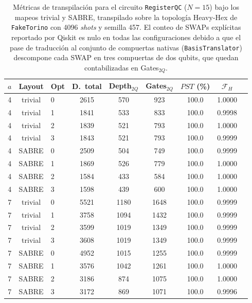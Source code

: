 \documentclass[12pt, spanish]{book}
\begin{document}
\begin{table}[H]
    \centering
    \caption{Métricas de transpilación para el circuito \texttt{RegisterQC} ($N = 15$) bajo los
    mapeos trivial y SABRE, transpilado sobre la topología Heavy-Hex de \texttt{FakeTorino} con
    4096 \textit{shots} y semilla 457. El conteo de SWAPs explícitas reportado por Qiskit es nulo en
    todas las configuraciones debido a que el pase de traducción al conjunto de compuertas
    nativas (\texttt{BasisTranslator}) descompone cada SWAP en tres compuertas de dos qubits,
    que quedan contabilizadas en Gates$_{2Q}$.}
    \label{tab:transpilacion_faketorino_sabre}
    \small
    \begin{tabular}{cclcccccc}
        \hline
        $a$ & Layout  & Opt & D.\ total & Depth$_{2Q}$ & Gates$_{2Q}$ & $PST$ (\%) & $\mathcal{F}_H$ \\
        \hline
        4  & trivial & 0 & 2615 & 570  & 923  & 100.0 & 1.0000 \\
        4  & trivial & 1 & 1841 & 533  & 833  & 100.0 & 0.9998 \\
        4  & trivial & 2 & 1839 & 521  & 793  & 100.0 & 1.0000 \\
        4  & trivial & 3 & 1843 & 521  & 793  & 100.0 & 0.9999 \\
        4  & SABRE   & 0 & 2509 & 504  & 749  & 100.0 & 0.9999 \\
        4  & SABRE   & 1 & 1869 & 526  & 779  & 100.0 & 1.0000 \\
        4  & SABRE   & 2 & 1584 & 433  & 584  & 100.0 & 1.0000 \\
        4  & SABRE   & 3 & 1598 & 439  & 600  & 100.0 & 1.0000 \\
        \hline
        7  & trivial & 0 & 5521 & 1180 & 1648 & 100.0 & 0.9999 \\
        7  & trivial & 1 & 3758 & 1094 & 1432 & 100.0 & 0.9999 \\
        7  & trivial & 2 & 3599 & 1019 & 1349 & 100.0 & 0.9999 \\
        7  & trivial & 3 & 3608 & 1019 & 1349 & 100.0 & 0.9999 \\
        7  & SABRE   & 0 & 4952 & 1015 & 1255 & 100.0 & 0.9999 \\
        7  & SABRE   & 1 & 3576 & 1042 & 1261 & 100.0 & 1.0000 \\
        7  & SABRE   & 2 & 3186 & 874  & 1075 & 100.0 & 1.0000 \\
        7  & SABRE   & 3 & 3172 & 869  & 1071 & 100.0 & 0.9996 \\

\end{tabular}
\end{table}
\end{document}
